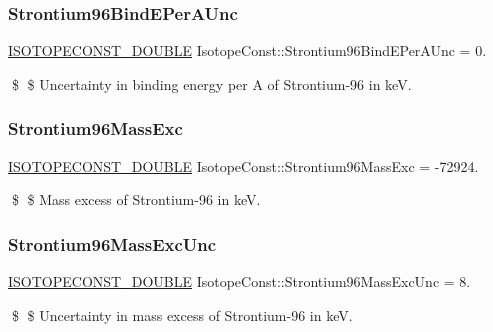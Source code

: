 \subsubsection{\texorpdfstring{Strontium96\+Bind\+E\+Per\+A\+Unc}{Strontium96BindEPerAUnc}}
{\footnotesize\ttfamily \mbox{\hyperlink{group___isotope_const-_macros_ga8f45a7272ce02c0b4c65c44636ed719a}{I\+S\+O\+T\+O\+P\+E\+C\+O\+N\+S\+T\+\_\+\+D\+O\+U\+B\+LE}} Isotope\+Const\+::\+Strontium96\+Bind\+E\+Per\+A\+Unc = 0.}

\$ \$ Uncertainty in binding energy per A of Strontium-\/96 in keV. \mbox{\label{group___isotope_const-_strontium-_sr96_ga8d5941a127c500460749421991f4f8fc}} 
\subsubsection{\texorpdfstring{Strontium96\+Mass\+Exc}{Strontium96MassExc}}
{\footnotesize\ttfamily \mbox{\hyperlink{group___isotope_const-_macros_ga8f45a7272ce02c0b4c65c44636ed719a}{I\+S\+O\+T\+O\+P\+E\+C\+O\+N\+S\+T\+\_\+\+D\+O\+U\+B\+LE}} Isotope\+Const\+::\+Strontium96\+Mass\+Exc = -\/72924.}

\$ \$ Mass excess of Strontium-\/96 in keV. \mbox{\label{group___isotope_const-_strontium-_sr96_ga8421456b134d18ae5f18cd36ba6caff5}} 
\subsubsection{\texorpdfstring{Strontium96\+Mass\+Exc\+Unc}{Strontium96MassExcUnc}}
{\footnotesize\ttfamily \mbox{\hyperlink{group___isotope_const-_macros_ga8f45a7272ce02c0b4c65c44636ed719a}{I\+S\+O\+T\+O\+P\+E\+C\+O\+N\+S\+T\+\_\+\+D\+O\+U\+B\+LE}} Isotope\+Const\+::\+Strontium96\+Mass\+Exc\+Unc = 8.}

\$ \$ Uncertainty in mass excess of Strontium-\/96 in keV. \mbox{\label{group___isotope_const-_strontium-_sr96_gad29a9a68c68e63d521ff8a3095d78ab7}} 
